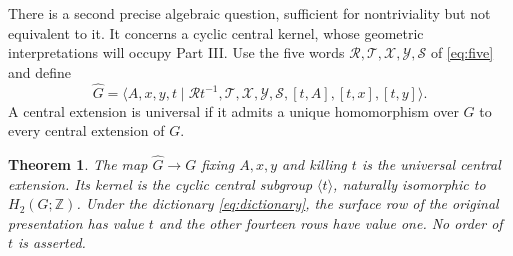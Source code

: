 \documentclass[11pt]{amsart}
\newtheorem{theorem}{Theorem}[section]
\theoremstyle{definition}
\theoremstyle{remark}
\newcommand{\Z}{\mathbb Z}
\begin{document}
There is a second precise algebraic question, sufficient for
nontriviality but not equivalent to it. It concerns a cyclic central
kernel, whose geometric interpretations will occupy Part III.
Use the five words $\mathcal R,\mathcal T,\mathcal X,\mathcal Y,
\mathcal S$ of \eqref{eq:five} and define
\begin{equation}\label{eq:universal-central}
 \widehat G=\langle A,x,y,t\mid
 \mathcal Rt^{-1},\mathcal T,\mathcal X,\mathcal Y,\mathcal S,
 [t,A],[t,x],[t,y]\rangle.
\end{equation}
A central extension is universal if it admits a unique homomorphism
over $G$ to every central extension of $G$.

\begin{theorem}\label{thm:central}
The map $\widehat G\to G$ fixing $A,x,y$ and killing $t$ is the
universal central extension. Its kernel is the cyclic central subgroup
$\langle t\rangle$, naturally isomorphic to $H_2(G;\Z)$.
Under the dictionary \eqref{eq:dictionary}, the surface row of the
original presentation has value $t$ and the other fourteen rows have
value one. No order of $t$ is asserted.
\end{theorem}
\end{document}
